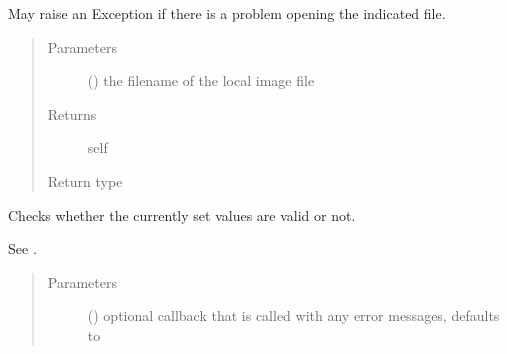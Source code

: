 \documentclass[letterpaper,10pt,english]{sphinxmanual}
\begin{document}
\begin{fulllineitems}
\begin{fulllineitems}
\sphinxAtStartPar
May raise an Exception if there is a problem opening the indicated file.
\begin{quote}\begin{description}
\item[{Parameters}] \leavevmode
\sphinxAtStartPar
{} () \textendash{} the filename of the local image file

\item[{Returns}] \leavevmode
\sphinxAtStartPar
self

\item[{Return type}] \leavevmode
\sphinxAtStartPar
{\hyperref[\detokenize{autoapi/pine/client/models/index:pine.client.models.CollectionBuilder}]{}}

\end{description}\end{quote}

\end{fulllineitems}


\begin{fulllineitems}
\label{\detokenize{autoapi/pine/client/index:pine.client.CollectionBuilder.is_valid}}
\sphinxAtStartPar
Checks whether the currently set values are valid or not.

\sphinxAtStartPar
See {\hyperref[\detokenize{autoapi/pine/client/models/index:pine.client.models.is_valid_collection}]{}}.
\begin{quote}\begin{description}
\item[{Parameters}] \leavevmode
\sphinxAtStartPar
{} (\sphinxstyleliteralemphasis{\sphinxupquote{, }}) \textendash{} optional callback that is called with any error messages, defaults to 


\end{description}
\end{quote}
\end{fulllineitems}
\end{fulllineitems}
\end{document}
